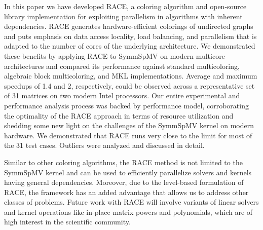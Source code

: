 In this paper we have developed \acrshort{RACE}, a coloring algorithm and open-source library
implementation for exploiting parallelism in algorithms with inherent dependencies.
\acrshort{RACE} generates hardware-efficient \DK colorings of undirected graphs and puts 
emphasis on data access locality, load balancing, and 
parallelism that is adapted to the number of cores of the underlying architecture.  We
demonstrated these benefits by applying \acrshort{RACE} to \acrfull{SymmSpMV} on modern
multicore architectures and compared its performance against
standard multicoloring, algebraic block multicoloring, and \acrshort{MKL}
implementations. Average and maximum speedups of 1.4 and 2, respectively,
could be observed across a representative set of 31 matrices on
two modern Intel processors. 
Our entire experimental and performance analysis process was backed by 
 \roofline performance model, corroborating the optimality of
the \acrshort{RACE} approach in terms of resource utilization and shedding some new
light on the challenges of the \acrshort{SymmSpMV} kernel on modern hardware.
We demonstrated that \acrshort{RACE} runs very close to the \roofline limit for
most of the 31 test cases. Outliers were analyzed and discussed in detail.

Similar to other coloring algorithms, the \acrshort{RACE} method is not
limited to the \acrshort{SymmSpMV} kernel and can be used to efficiently
parallelize solvers and kernels having general \DK dependencies. Moreover, due
to the level-based formulation of \acrshort{RACE}, the framework has an added
advantage that allows us to address other classes of problems. Future work
with \acrshort{RACE} will involve variants of linear solvers and kernel
operations like in-place matrix powers and polynomials, which are of high
interest in the scientific community.



